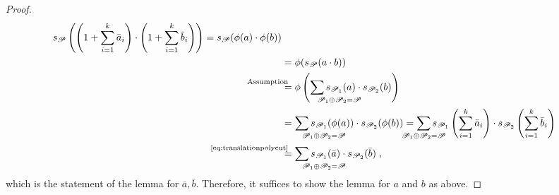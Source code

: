 \begin{Lem}
\begin{proof}
\begin{align*}
      \s{\Part}\left(
        \left( 1+\sum_{i=1}^{k}\bar a_i \right) \cdot
        \left( 1+\sum_{i=1}^{k}\bar b_i \right)
      \right)
      = \s{\Part}(\phi(a)\cdot \phi(b)) \\
      &= \phi(\s{\Part}(a\cdot b)) \\
      &\equalsby{Assumption} \phi\left(
      \sum_{\mathrlap{\Part_1\concat\Part_2=\Part}}
      \s{\Part_1}(a) \cdot \s{\Part_2}(b)
      \right) \\
      &= \sum_{\mathrlap{\Part_1\concat\Part_2=\Part}}
        \s{\Part_1}(\phi(a)) \cdot \s{\Part_2}(\phi(b)) 
      =
        \sum_{\mathclap{\Part_1\concat\Part_2=\Part}}
        \s{\Part_1}\left( \sum_{i=1}^{k}\bar a_i \right)
        \cdot \s{\Part_2}\left( \sum_{i=1}^{k}\bar b_i \right) \\
      &\equalsby{\eqref{eq:translationpolycut}}
        \sum_{\mathrlap{\Part_1\concat\Part_2=\Part}}
        \s{\Part_1}(\bar a) \cdot \s{\Part_2}(\bar b)
      \;,
    \end{align*}
    which is the statement of the lemma for $\bar a, \bar b$.
    Therefore, it suffices to show the lemma for $a$ and $b$ as
    above.
    

\end{proof}
\end{Lem}
